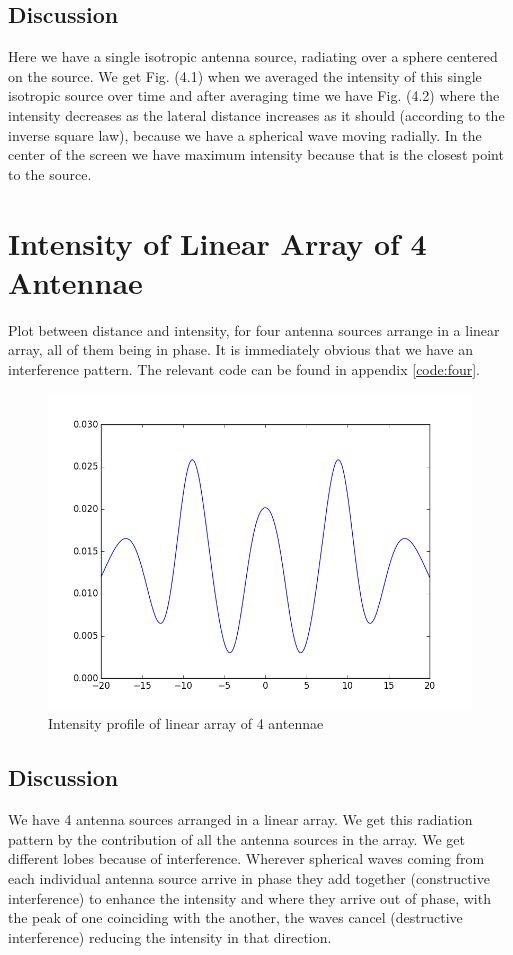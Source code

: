 \subsection{Discussion}

Here we have a single isotropic antenna source, radiating over a sphere centered on the source. We get Fig. (4.1) when we averaged the intensity of this single isotropic source over time and after averaging time we have Fig. (4.2) where the intensity decreases as the lateral distance increases as it should (according to the inverse square law), because we have a spherical wave moving radially. In the center of the screen we have maximum intensity because that is the closest point to the source. 


\section{Intensity of Linear Array of 4 Antennae}

Plot between distance and intensity, for four antenna sources arrange in a linear array, all of them being in phase. It is immediately obvious that we have an interference pattern. The relevant code can be found in appendix \ref{code:four}.

\begin{figure}[!h]
	\centering	
    \includegraphics[scale=0.45]{figure_2.png}
	\caption{Intensity profile of linear array of 4 antennae}
\end{figure}

\subsection{Discussion}
We have 4 antenna sources arranged in a linear array. We get this radiation pattern by the contribution of all the antenna sources in the array. We get different lobes because of interference. Wherever spherical waves coming from each individual antenna source arrive in phase they add together (constructive interference) to enhance the intensity and where they arrive out of phase, with the peak of one coinciding with the another, the waves cancel (destructive interference) reducing the intensity in that direction.

